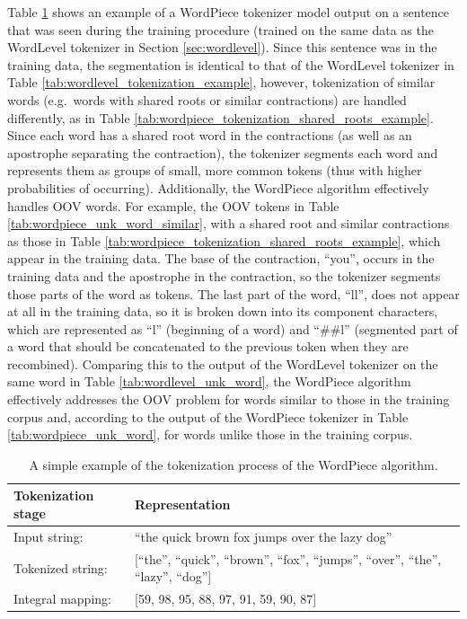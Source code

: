 \documentclass[12pt]{article}
\begin{document}
Table \ref{tab:wordpiece_tokenization_example} shows an example of a WordPiece tokenizer model output on a sentence that was seen during the training
procedure (trained on the same data as the WordLevel tokenizer in Section \ref{sec:wordlevel}). Since this sentence was in the training data, the
segmentation is identical to that of the WordLevel tokenizer in Table \ref{tab:wordlevel_tokenization_example}, however, tokenization of similar
words (e.g.~words with shared roots or similar contractions) are handled differently, as in Table
\ref{tab:wordpiece_tokenization_shared_roots_example}. Since each word has a shared root word in the contractions (as well as an apostrophe separating
the contraction), the tokenizer segments each word and represents them as groups of small, more common tokens (thus with higher probabilities of
occurring). Additionally, the WordPiece algorithm effectively handles OOV words. For example, the OOV tokens in Table
\ref{tab:wordpiece_unk_word_similar}, with a shared root and similar contractions as those in Table
\ref{tab:wordpiece_tokenization_shared_roots_example}, which appear in the training data. The base of the contraction, ``you'', occurs in the training
data and the apostrophe in the contraction, so the tokenizer segments those parts of the word as tokens. The last part of the word, ``ll'', does not
appear at all in the training data, so it is broken down into its component characters, which are represented as ``l'' (beginning of a word) and
``\#\#l'' (segmented part of a word that should be concatenated to the previous token when they are recombined). Comparing this to the output of the
WordLevel tokenizer on the same word in Table \ref{tab:wordlevel_unk_word}, the WordPiece algorithm effectively addresses the OOV problem for words
similar to those in the training corpus and, according to the output of the WordPiece tokenizer in Table \ref{tab:wordpiece_unk_word}, for words
unlike those in the training corpus.

\begin{table}[!t]
    \centering
    \begin{tabular}{l l}
        \toprule
        Tokenization stage & Representation                                                                            \\
        \midrule
        Input string:      & ``the quick brown fox jumps over the lazy dog''                                           \\
        Tokenized string:  & [``the'', ``quick'', ``brown'', ``fox'', ``jumps'', ``over'', ``the'', ``lazy'', ``dog''] \\
        Integral mapping:  & [59, 98, 95, 88, 97, 91, 59, 90, 87]                                                      \\
        \bottomrule
    \end{tabular}
    \caption{A simple example of the tokenization process of the WordPiece algorithm.}
    \label{tab:wordpiece_tokenization_example}
\end{table}
\end{document}

